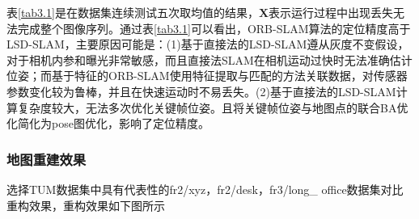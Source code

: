 表\ref{tab3.1}是在数据集连续测试五次取均值的结果，$\boldsymbol{X}$表示运行过程中出现丢失无法完成整个图像序列。通过表\ref{tab3.1}可以看出，ORB-SLAM算法的定位精度高于LSD-SLAM，主要原因可能是：(1)基于直接法的LSD-SLAM遵从灰度不变假设，对于相机内参和曝光非常敏感，而且直接法SLAM在相机运动过快时无法准确估计位姿；而基于特征的ORB-SLAM使用特征提取与匹配的方法关联数据，对传感器参数变化较为鲁棒，并且在快速运动时不易丢失。(2)基于直接法的LSD-SLAM计算复杂度较大，无法多次优化关键帧位姿。且将关键帧位姿与地图点的联合BA优化简化为pose图优化，影响了定位精度。

\subsubsection*{地图重建效果}
选择TUM数据集中具有代表性的fr2/xyz，fr2/desk，fr3/long\_ office数据集对比重构效果，重构效果如下图所示
